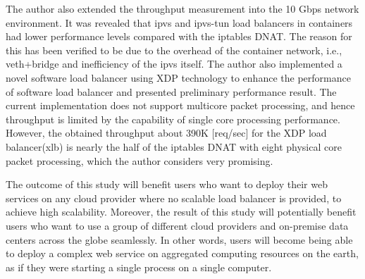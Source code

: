 The author also extended the throughput measurement into the 10 Gbps network environment.
It was revealed that ipvs and ipvs-tun load balancers in containers had lower performance levels compared with the iptables DNAT.
The reason for this has been verified to be due to the overhead of the container network, i.e., veth+bridge and inefficiency of the ipvs itself.
The author also implemented a novel software load balancer using XDP technology to enhance the performance of software load balancer and presented preliminary performance result.
The current implementation does not support multicore packet processing, and hence throughput is limited by the capability of single core processing performance.
However, the obtained throughput about 390K [req/sec] for the XDP load balancer(xlb) is nearly the half of the iptables DNAT with eight physical core packet processing, which the author considers very promising.
 
The outcome of this study will benefit users who want to deploy their web services on any cloud provider where no scalable load balancer is provided, to achieve high scalability.
Moreover, the result of this study will potentially benefit users who want to use a group of different cloud providers and on-premise data centers across the globe seamlessly.
In other words, users will become being able to deploy a complex web service on aggregated computing resources on the earth, as if they were starting a single process on a single computer.


